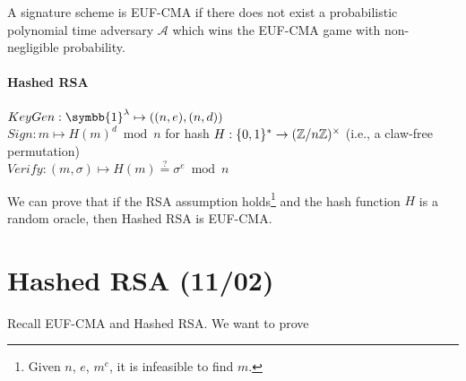 \documentclass[notes]{agony}
\newcommand{\one}{\symbb{1}}
\newcommand{\mgrp}[1]{(\Z/#1\Z)^\times}
\begin{document}
\begin{defn}
  A signature scheme is EUF-CMA if there does not exist a probabilistic polynomial time
  adversary $\mathcal A$ which wins the EUF-CMA game with non-negligible probability.
\end{defn}

\paragraph{Hashed RSA} $KeyGen : \one^\lambda \mapsto ((n,e), (n,d))$ \\
$Sign : m \mapsto H(m)^d \bmod n$ for hash $H : \{0,1\}^* \to \mgrp n$ (i.e., a claw-free permutation) \\
$Verify : (m, \sigma) \mapsto H(m) \stackrel{?}{=} \sigma^e \bmod n$

We can prove that if the RSA assumption holds\footnote{Given $n$, $e$, $m^e$, it is infeasible to find $m$.}
and the hash function $H$ is a random oracle,
then Hashed RSA is EUF-CMA.

\section{Hashed RSA (11/02)}

Recall EUF-CMA and Hashed RSA. We want to prove
\end{document}
